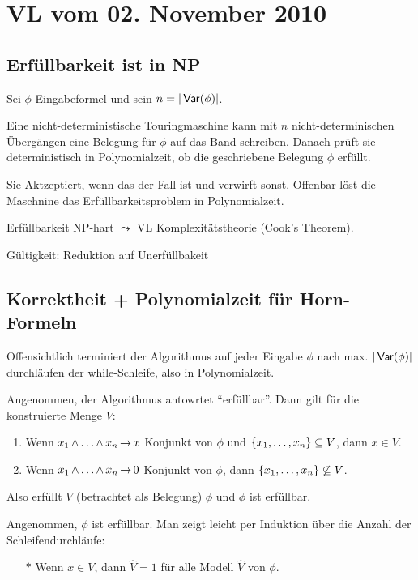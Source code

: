 \section{VL vom 02. November 2010}

\subsection{Erfüllbarkeit ist in NP}

Sei $\phi$ Eingabeformel und sein $n = |\operatorname{\text{\textsf{Var}}}(\phi)|$.

Eine nicht-deterministische Touringmaschine kann mit $n$ nicht-determinischen
Übergängen eine Belegung für $\phi$ auf das Band schreiben. Danach prüft sie
deterministisch in Polynomialzeit, ob die geschriebene Belegung $\phi$ erfüllt.

Sie Aktzeptiert, wenn das der Fall ist und verwirft sonst. Offenbar löst die
Maschnine das Erfüllbarkeitsproblem in Polynomialzeit.

Erfüllbarkeit NP-hart $\leadsto$ VL Komplexitätstheorie (Cook's Theorem).

Gültigkeit: Reduktion auf Unerfüllbakeit 

\subsection{Korrektheit + Polynomialzeit für Horn-Formeln}

Offensichtlich terminiert der Algorithmus auf jeder Eingabe $\phi$ nach max.
$|\operatorname{\text{\textsf{Var}}}(\phi)|$ durchläufen der while-Schleife, also in Polynomialzeit.

Angenommen, der Algorithmus antowrtet \enquote{erfüllbar}. Dann gilt für die
konstruierte Menge $V$:

\begin{enumerate}
  \item Wenn $x_1\operatorname{\wedge}\dots\operatorname{\wedge} x_n \operatorname{\rightarrow} x$ Konjunkt von $\phi$ und $\left\{x_1,\dots,x_n\right\} \subseteq V$, dann $x \in V$.
  \item Wenn $x_1\operatorname{\wedge}\dots\operatorname{\wedge} x_n \operatorname{\rightarrow} 0$ Konjunkt von $\phi$, dann $\left\{x_1,\dots,x_n\right\} \not\subseteq V$.
\end{enumerate}

Also erfüllt $V$ (betrachtet als Belegung) $\phi$ und $\phi$ ist erfüllbar.

Angenommen, $\phi$ ist erfüllbar. Man zeigt leicht per Induktion über die Anzahl der Schleifendurchläufe:

\begin{itemize}
  \item[$*$] Wenn $x \in V$, dann $\hat{V}=1$ für alle Modell $\hat{V}$ von $\phi$.
\end{itemize}

